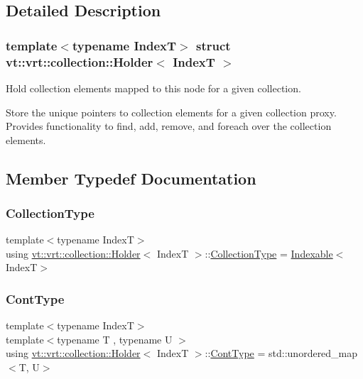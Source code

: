 \subsection{Detailed Description}
\subsubsection*{template$<$typename IndexT$>$\newline
struct vt\+::vrt\+::collection\+::\+Holder$<$ Index\+T $>$}

Hold collection elements mapped to this node for a given collection. 

Store the unique pointers to collection elements for a given collection proxy. Provides functionality to find, add, remove, and foreach over the collection elements. 

\subsection{Member Typedef Documentation}
\mbox{\label{structvt_1_1vrt_1_1collection_1_1_holder_ad940337a70ac576f960ea2d22a33f290}} 
\subsubsection{\texorpdfstring{Collection\+Type}{CollectionType}}
{\footnotesize\ttfamily template$<$typename IndexT$>$ \\
using \hyperlink{structvt_1_1vrt_1_1collection_1_1_holder}{vt\+::vrt\+::collection\+::\+Holder}$<$ IndexT $>$\+::\hyperlink{structvt_1_1vrt_1_1collection_1_1_holder_ad940337a70ac576f960ea2d22a33f290}{Collection\+Type} =  \hyperlink{structvt_1_1vrt_1_1collection_1_1_indexable}{Indexable}$<$IndexT$>$}

\mbox{\label{structvt_1_1vrt_1_1collection_1_1_holder_a89a4952463fceb239ce3415304526dc9}} 
\subsubsection{\texorpdfstring{Cont\+Type}{ContType}}
{\footnotesize\ttfamily template$<$typename IndexT$>$ \\
template$<$typename T , typename U $>$ \\
using \hyperlink{structvt_1_1vrt_1_1collection_1_1_holder}{vt\+::vrt\+::collection\+::\+Holder}$<$ IndexT $>$\+::\hyperlink{structvt_1_1vrt_1_1collection_1_1_holder_a89a4952463fceb239ce3415304526dc9}{Cont\+Type} =  std\+::unordered\+\_\+map$<$T, U$>$}

